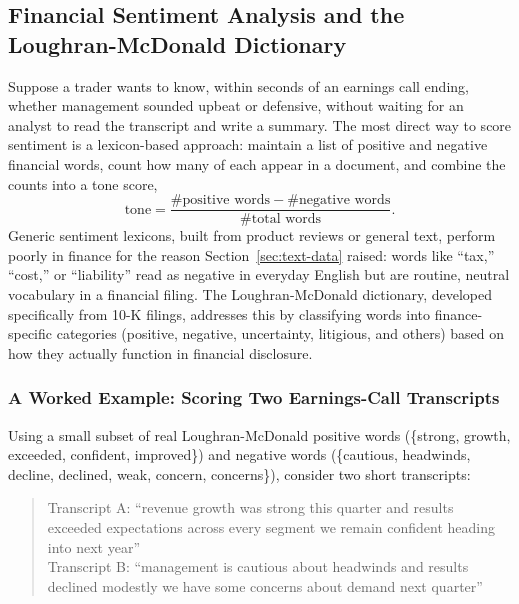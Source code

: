 \documentclass[../ai_in_finance]{subfiles}
\begin{document}
\subsection{Financial Sentiment Analysis and the Loughran-McDonald Dictionary}
\label{sec:sentiment}

Suppose a trader wants to know, within seconds of an earnings call ending, whether management sounded upbeat or defensive, without waiting for an analyst to read the transcript and write a summary. The most direct way to score sentiment is a lexicon-based approach: maintain a list of positive and negative financial words, count how many of each appear in a document, and combine the counts into a tone score,
\begin{equation*}
\text{tone} = \frac{\#\text{positive words} - \#\text{negative words}}{\#\text{total words}}.
\end{equation*}
Generic sentiment lexicons, built from product reviews or general text, perform poorly in finance for the reason Section~\ref{sec:text-data} raised: words like ``tax,'' ``cost,'' or ``liability'' read as negative in everyday English but are routine, neutral vocabulary in a financial filing. The Loughran-McDonald dictionary, developed specifically from 10-K filings, addresses this by classifying words into finance-specific categories (positive, negative, uncertainty, litigious, and others) based on how they actually function in financial disclosure.

\subsubsection*{A Worked Example: Scoring Two Earnings-Call Transcripts}

Using a small subset of real Loughran-McDonald positive words (\{strong, growth, exceeded, confident, improved\}) and negative words (\{cautious, headwinds, decline, declined, weak, concern, concerns\}), consider two short transcripts:

\begin{quote}
\small
Transcript A: ``revenue growth was strong this quarter and results exceeded expectations across every segment we remain confident heading into next year''\\
Transcript B: ``management is cautious about headwinds and results declined modestly we have some concerns about demand next quarter''
\end{quote}
\end{document}
